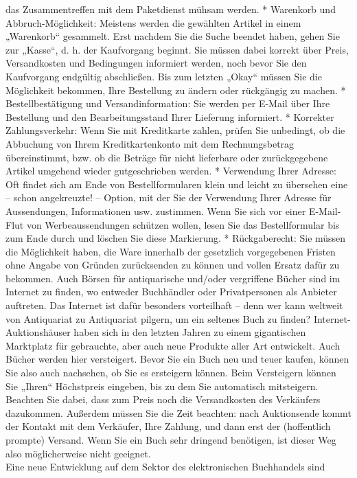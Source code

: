 \documentclass[]{book}
\theoremstyle{definition}
\theoremstyle{definition}
\theoremstyle{definition}
\theoremstyle{remark}
\begin{document}
das Zusammentreffen mit dem Paketdienst mühsam werden. * Warenkorb und
Abbruch-Möglichkeit: Meistens werden die gewählten Artikel in einem
„Warenkorb`` gesammelt. Erst nachdem Sie die Suche beendet haben, gehen
Sie zur „Kasse``, d. h. der Kaufvorgang beginnt. Sie müssen dabei
korrekt über Preis, Versandkosten und Bedingungen informiert werden,
noch bevor Sie den Kaufvorgang endgültig abschließen. Bis zum letzten
„Okay`` müssen Sie die Möglichkeit bekommen, Ihre Bestellung zu ändern
oder rückgängig zu machen. * Bestellbestätigung und Versandinformation:
Sie werden per E-Mail über Ihre Bestellung und den Bearbeitungsstand
Ihrer Lieferung informiert. * Korrekter Zahlungsverkehr: Wenn Sie mit
Kreditkarte zahlen, prüfen Sie unbedingt, ob die Abbuchung von Ihrem
Kreditkartenkonto mit dem Rechnungsbetrag übereinstimmt, bzw. ob die
Beträge für nicht lieferbare oder zurückgegebene Artikel umgehend wieder
gutgeschrieben werden. * Verwendung Ihrer Adresse: Oft findet sich am
Ende von Bestellformularen klein und leicht zu übersehen eine -- schon
angekreuzte! -- Option, mit der Sie der Verwendung Ihrer Adresse für
Aussendungen, Informationen usw. zustimmen. Wenn Sie sich vor einer
E-Mail-Flut von Werbeaussendungen schützen wollen, lesen Sie das
Bestellformular bis zum Ende durch und löschen Sie diese Markierung. *
Rückgaberecht: Sie müssen die Möglichkeit haben, die Ware innerhalb der
gesetzlich vorgegebenen Fristen ohne Angabe von Gründen zurücksenden zu
können und vollen Ersatz dafür zu bekommen. Auch Börsen für
antiquarische und/oder vergriffene Bücher sind im Internet zu finden, wo
entweder Buchhändler oder Privatpersonen als Anbieter auftreten. Das
Internet ist dafür besonders vorteilhaft -- denn wer kann weltweit von
Antiquariat zu Antiquariat pilgern, um ein seltenes Buch zu finden?
Internet-Auktionshäuser haben sich in den letzten Jahren zu einem
gigantischen Marktplatz für gebrauchte, aber auch neue Produkte aller
Art entwickelt. Auch Bücher werden hier versteigert. Bevor Sie ein Buch
neu und teuer kaufen, können Sie also auch nachsehen, ob Sie es
ersteigern können. Beim Versteigern können Sie „Ihren`` Höchstpreis
eingeben, bis zu dem Sie automatisch mitsteigern. Beachten Sie dabei,
dass zum Preis noch die Versandkosten des Verkäufers dazukommen.
Außerdem müssen Sie die Zeit beachten: nach Auktionsende kommt der
Kontakt mit dem Verkäufer, Ihre Zahlung, und dann erst der (hoffentlich
prompte) Versand. Wenn Sie ein Buch sehr dringend benötigen, ist dieser
Weg also möglicherweise nicht geeignet.\\
Eine neue Entwicklung auf dem Sektor des elektronischen Buchhandels sind
\end{document}
